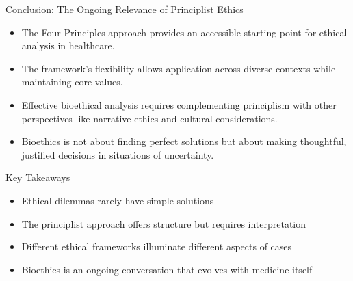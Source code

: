 \documentclass{beamer}
\begin{document}
	\begin{frame}{Conclusion: The Ongoing Relevance of Principlist Ethics}
		\begin{itemize}
			\item The Four Principles approach provides an accessible starting point for ethical analysis in healthcare.
			\item The framework's flexibility allows application across diverse contexts while maintaining core values.
			\item Effective bioethical analysis requires complementing principlism with other perspectives like narrative ethics and cultural considerations.
			\item Bioethics is not about finding perfect solutions but about making thoughtful, justified decisions in situations of uncertainty.
		\end{itemize}
		
		\begin{block}{Key Takeaways}
			\begin{itemize}
				\item Ethical dilemmas rarely have simple solutions
				\item The principlist approach offers structure but requires interpretation
				\item Different ethical frameworks illuminate different aspects of cases
				\item Bioethics is an ongoing conversation that evolves with medicine itself
			\end{itemize}
		\end{block}
	\end{frame}
	
\end{document}
